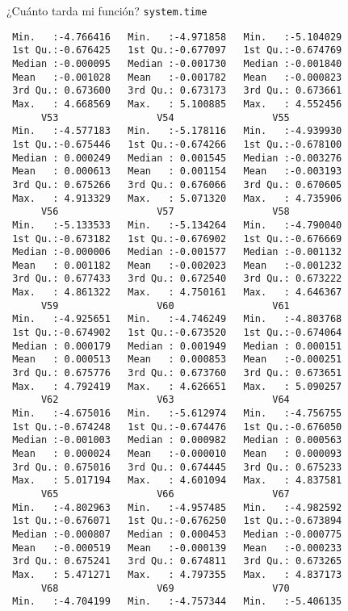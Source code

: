 \documentclass[xcolor={usenames,svgnames,dvipsnames}]{beamer}
\begin{document}
\begin{frame}[label={sec:org4570aee},fragile]{¿Cuánto tarda mi función? \texttt{system.time}}
\begin{verbatim}
 Min.   :-4.766416   Min.   :-4.971858   Min.   :-5.104029  
 1st Qu.:-0.676425   1st Qu.:-0.677097   1st Qu.:-0.674769  
 Median :-0.000095   Median :-0.001730   Median :-0.001840  
 Mean   :-0.001028   Mean   :-0.001782   Mean   :-0.000823  
 3rd Qu.: 0.673600   3rd Qu.: 0.673173   3rd Qu.: 0.673661  
 Max.   : 4.668569   Max.   : 5.100885   Max.   : 4.552456  
      V53                 V54                 V55           
 Min.   :-4.577183   Min.   :-5.178116   Min.   :-4.939930  
 1st Qu.:-0.675446   1st Qu.:-0.674266   1st Qu.:-0.678100  
 Median : 0.000249   Median : 0.001545   Median :-0.003276  
 Mean   : 0.000613   Mean   : 0.001154   Mean   :-0.003193  
 3rd Qu.: 0.675266   3rd Qu.: 0.676066   3rd Qu.: 0.670605  
 Max.   : 4.913329   Max.   : 5.071320   Max.   : 4.735906  
      V56                 V57                 V58           
 Min.   :-5.133533   Min.   :-5.134264   Min.   :-4.790040  
 1st Qu.:-0.673182   1st Qu.:-0.676902   1st Qu.:-0.676669  
 Median :-0.000006   Median :-0.001577   Median :-0.001132  
 Mean   : 0.001182   Mean   :-0.002023   Mean   :-0.001232  
 3rd Qu.: 0.677433   3rd Qu.: 0.672540   3rd Qu.: 0.673222  
 Max.   : 4.861322   Max.   : 4.750161   Max.   : 4.646367  
      V59                 V60                 V61           
 Min.   :-4.925651   Min.   :-4.746249   Min.   :-4.803768  
 1st Qu.:-0.674902   1st Qu.:-0.673520   1st Qu.:-0.674064  
 Median : 0.000179   Median : 0.001949   Median : 0.000151  
 Mean   : 0.000513   Mean   : 0.000853   Mean   :-0.000251  
 3rd Qu.: 0.675776   3rd Qu.: 0.673760   3rd Qu.: 0.673651  
 Max.   : 4.792419   Max.   : 4.626651   Max.   : 5.090257  
      V62                 V63                 V64           
 Min.   :-4.675016   Min.   :-5.612974   Min.   :-4.756755  
 1st Qu.:-0.674248   1st Qu.:-0.674476   1st Qu.:-0.676050  
 Median :-0.001003   Median : 0.000982   Median : 0.000563  
 Mean   : 0.000024   Mean   :-0.000010   Mean   : 0.000093  
 3rd Qu.: 0.675016   3rd Qu.: 0.674445   3rd Qu.: 0.675233  
 Max.   : 5.017194   Max.   : 4.601094   Max.   : 4.837581  
      V65                 V66                 V67           
 Min.   :-4.802963   Min.   :-4.957485   Min.   :-4.982592  
 1st Qu.:-0.676071   1st Qu.:-0.676250   1st Qu.:-0.673894  
 Median :-0.000807   Median : 0.000453   Median :-0.000775  
 Mean   :-0.000519   Mean   :-0.000139   Mean   :-0.000233  
 3rd Qu.: 0.675241   3rd Qu.: 0.674811   3rd Qu.: 0.673265  
 Max.   : 5.471271   Max.   : 4.797355   Max.   : 4.837173  
      V68                 V69                 V70           
 Min.   :-4.704199   Min.   :-4.757344   Min.   :-5.406135  

\end{verbatim}
\end{frame}
\end{document}
